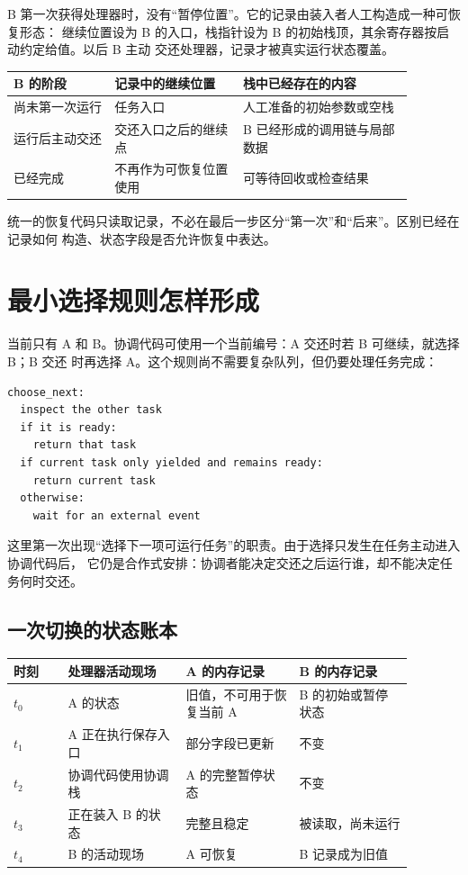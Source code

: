 B 第一次获得处理器时，没有“暂停位置”。它的记录由装入者人工构造成一种可恢复形态：
继续位置设为 B 的入口，栈指针设为 B 的初始栈顶，其余寄存器按启动约定给值。以后 B 主动
交还处理器，记录才被真实运行状态覆盖。

\begin{longtable}{|L{0.22\linewidth}|L{0.29\linewidth}|L{0.37\linewidth}|}
\hline
{}
B 的阶段 & 记录中的继续位置 & 栈中已经存在的内容 \\ \hline
尚未第一次运行 & 任务入口 & 人工准备的初始参数或空栈 \\ \hline
运行后主动交还 & 交还入口之后的继续点 & B 已经形成的调用链与局部数据 \\ \hline
已经完成 & 不再作为可恢复位置使用 & 可等待回收或检查结果 \\ \hline
\end{longtable}

统一的恢复代码只读取记录，不必在最后一步区分“第一次”和“后来”。区别已经在记录如何
构造、状态字段是否允许恢复中表达。

\section{最小选择规则怎样形成}

当前只有 A 和 B。协调代码可使用一个当前编号：A 交还时若 B 可继续，就选择 B；B 交还
时再选择 A。这个规则尚不需要复杂队列，但仍要处理任务完成：

\begin{lstlisting}
choose_next:
  inspect the other task
  if it is ready:
    return that task
  if current task only yielded and remains ready:
    return current task
  otherwise:
    wait for an external event
\end{lstlisting}

这里第一次出现“选择下一项可运行任务”的职责。由于选择只发生在任务主动进入协调代码后，
它仍是合作式安排：协调者能决定交还之后运行谁，却不能决定任务何时交还。

\subsection{一次切换的状态账本}

\begin{longtable}{|L{0.12\linewidth}|L{0.26\linewidth}|L{0.25\linewidth}|L{0.25\linewidth}|}
\hline
{}
时刻 & 处理器活动现场 & A 的内存记录 & B 的内存记录 \\ \hline
\(t_0\) & A 的状态 & 旧值，不可用于恢复当前 A & B 的初始或暂停状态 \\ \hline
\(t_1\) & A 正在执行保存入口 & 部分字段已更新 & 不变 \\ \hline
\(t_2\) & 协调代码使用协调栈 & A 的完整暂停状态 & 不变 \\ \hline
\(t_3\) & 正在装入 B 的状态 & 完整且稳定 & 被读取，尚未运行 \\ \hline
\(t_4\) & B 的活动现场 & A 可恢复 & B 记录成为旧值 \\ \hline
\end{longtable}

